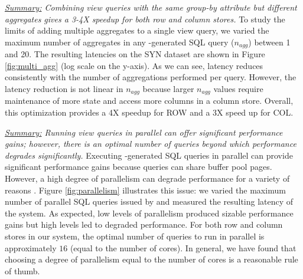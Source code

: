 {\em \underline{Summary:} Com\-bining 
view quer\-ies with the same group-by attribute
but different aggregates gives a 
3-4X speedup for both row and column stores.}
To study the limits of adding multiple aggregates to a single view query, we
varied the maximum number of aggregates in any \SeeDB-generated SQL query 
($n_{agg}$) between 1 and 20.
The resulting latencies on the SYN dataset are shown in Figure \ref{fig:multi_agg} (log scale on the y-axis).
As we can see, latency reduces consistently with the number of aggregations performed 
per query.
However, the latency reduction is not linear in $n_{agg}$ because
larger $n_{agg}$ values require maintenance of more state and access more columns in a 
column store.
Overall, this optimization provides a 4X speedup for ROW and a 3X speed up for COL.

{\em \underline{Summary:} Running view queries in parallel can offer significant
performance gains; however, there is an optimal number of queries
beyond which performance degrades significantly.}
Executing \SeeDB-generated SQL queries in parallel can provide significant performance gains
because queries can share buffer pool pages.
However, a high degree of parallelism can degrade performance for a variety of reasons \cite{Postgres_wiki}. 
Figure \ref{fig:parallelism} illustrates this issue: we varied the maximum number of parallel SQL queries
issued by \SeeDB and measured the resulting latency of the system.
As expected, low levels of parallelism produced sizable performance gains but
high levels led to degraded performance.
For both row and column stores in our system, the optimal number of queries to 
run in parallel is approximately $16$ (equal to the number of cores). 
In general, we have found that choosing a degree of parallelism equal to the number of cores
is a reasonable rule of thumb. 

